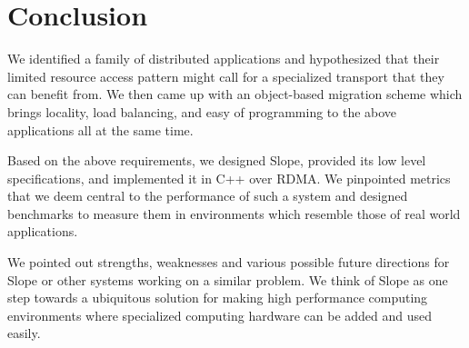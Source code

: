 \section{Conclusion}

We identified a family of distributed applications and hypothesized that
their limited resource access pattern might call for a specialized transport
that they can benefit from. We then came up with an object-based migration
scheme which brings locality, load balancing, and easy of programming to the
above applications all at the same time.

Based on the above requirements, we designed Slope, provided its low level
specifications, and implemented it in C++ over RDMA. We pinpointed metrics that
we deem central to the performance of such a system and designed benchmarks to
measure them in environments which resemble those of real world applications.

We pointed out strengths, weaknesses and various possible future directions for
Slope or other systems working on a similar problem. We think of Slope as one
step towards a ubiquitous solution for making high performance computing
environments where specialized computing hardware can be added and used easily.

